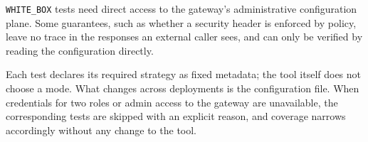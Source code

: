 \texttt{WHITE\_BOX} tests need direct access to the gateway's administrative configuration plane.
Some guarantees, such as whether a security header is enforced by policy, leave no trace in the responses an external caller sees, and can only be verified by reading the configuration directly.

Each test declares its required strategy as fixed metadata; the tool itself does not choose a mode.
What changes across deployments is the configuration file. When credentials for two roles or admin access to the gateway are unavailable, the corresponding tests are skipped with an explicit reason, and coverage narrows accordingly without any change to the tool.

